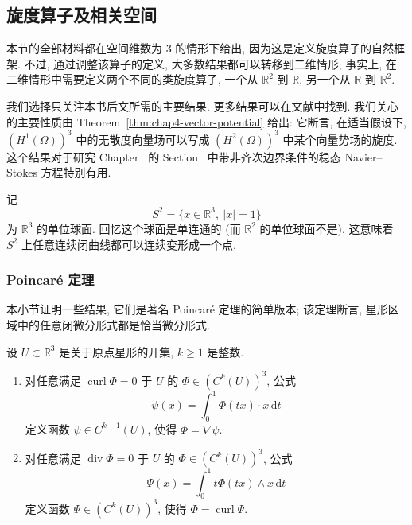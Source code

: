 \subsection{旋度算子及相关空间}
\label{sec:chap4-curl-spaces}

\renewcommand{\thestatement}{4.\arabic{statement}}
\renewcommand{\theHstatement}{ch04.sec04.\arabic{statement}}
\setcounter{statement}{0}
\renewcommand{\thefigure}{IV.\arabic{figure}}
\renewcommand{\theHfigure}{ch04.\arabic{figure}}
\setcounter{figure}{0}
\renewcommand{\thechapterfoursectionfourremark}{4.\arabic{chapterfoursectionfourremark}}

本节的全部材料都在空间维数为 $3$ 的情形下给出, 因为这是定义旋度算子的自然框架. 不过, 通过调整该算子的定义, 大多数结果都可以转移到二维情形; 事实上, 在二维情形中需要定义两个不同的类旋度算子, 一个从 $\mathbb R^2$ 到 $\mathbb R$, 另一个从 $\mathbb R$ 到 $\mathbb R^2$.

我们选择只关注本书后文所需的主要结果. 更多结果可以在文献中找到. 我们关心的主要性质由 Theorem~\ref{thm:chap4-vector-potential} 给出: 它断言, 在适当假设下, $(H^1(\Omega))^3$ 中的无散度向量场可以写成 $(H^2(\Omega))^3$ 中某个向量势场的旋度. 这个结果对于研究 Chapter~ 的 Section~ 中带非齐次边界条件的稳态 Navier--Stokes 方程特别有用.

记
\[
 S^2=\{x\in\mathbb R^3,\ |x|=1\}
\]
为 $\mathbb R^3$ 的单位球面. 回忆这个球面是单连通的 (而 $\mathbb R^2$ 的单位球面不是). 这意味着 $S^2$ 上任意连续闭曲线都可以连续变形成一个点.

\subsubsection{Poincaré 定理}
\label{subsec:chap4-poincare-theorems}

本小节证明一些结果, 它们是著名 Poincaré 定理的简单版本; 该定理断言, 星形区域中的任意闭微分形式都是恰当微分形式.

\begin{Lemma}
\label{lem:chap4-poincare-star-shaped}
设 $U\subset\mathbb R^3$ 是关于原点星形的开集, $k\geq1$ 是整数.
\begin{enumerate}
 \item 对任意满足 $\operatorname{curl}\Phi=0$ 于 $U$ 的 $\Phi\in(C^k(U))^3$, 公式
 \begin{equation}
  \psi(x)=\int_0^1\Phi(tx)\cdot x\,\mathrm dt
  \label{eq:chap4-poincare-scalar-potential}
 \end{equation}
 定义函数 $\psi\in C^{k+1}(U)$, 使得 $\Phi=\nabla\psi$.
 \item 对任意满足 $\operatorname{div}\Phi=0$ 于 $U$ 的 $\Phi\in(C^k(U))^3$, 公式
 \[
  \Psi(x)=\int_0^1t\Phi(tx)\wedge x\,\mathrm dt
 \]
 定义函数 $\Psi\in(C^k(U))^3$, 使得 $\Phi=\operatorname{curl}\Psi$.
\end{enumerate}
\end{Lemma}

